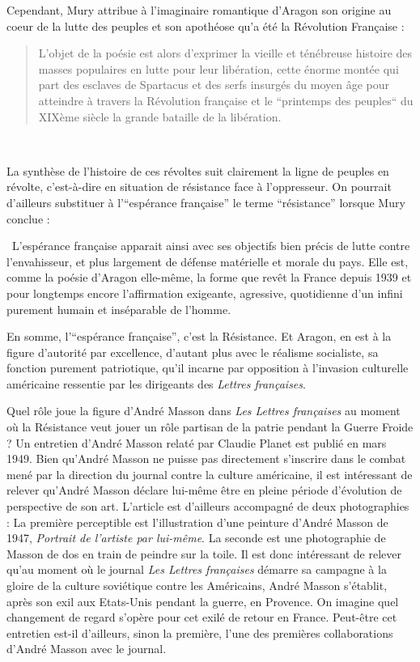 Cependant, Mury attribue à l’imaginaire romantique d’Aragon son origine au coeur de la lutte des peuples et son apothéose qu’a été la Révolution Française : 

\begin{quote}
 L’objet de la poésie est alors d’exprimer la vieille et ténébreuse histoire des masses populaires en lutte pour leur libération, cette énorme montée qui part des esclaves de Spartacus et des serfs insurgés du moyen âge pour atteindre à travers la Révolution française et le “printemps des peuples“ du XIXème siècle la grande bataille de la libération.   
\end{quote} 

 La synthèse de l’histoire de ces révoltes suit clairement la ligne de peuples en révolte, c’est-à-dire en situation de résistance face à l’oppresseur. On pourrait d’ailleurs substituer à l’\enquote{espérance française} le terme \enquote{résistance} lorsque Mury conclue : 

 L’espérance française apparait ainsi avec ses objectifs bien précis de lutte contre l’envahisseur, et plus largement de défense matérielle et morale du pays. Elle est, comme la poésie d’Aragon elle-même, la forme que revêt la France depuis 1939 et pour longtemps encore l’affirmation exigeante, agressive, quotidienne d’un infini purement humain et inséparable de l’homme.

	 En somme, l’\enquote{espérance française}, c’est la Résistance. Et Aragon, en est à la figure d’autorité par excellence, d’autant plus avec le réalisme socialiste, sa fonction purement patriotique, qu’il incarne par opposition à l’invasion culturelle américaine ressentie par les dirigeants des \emph{Lettres françaises}. 

     Quel rôle joue la figure d’André Masson dans \emph{Les Lettres françaises} au moment où la Résistance veut jouer un rôle partisan de la patrie pendant la Guerre Froide ? Un entretien d’André Masson relaté par Claudie Planet est publié en mars 1949. Bien qu’André Masson ne puisse pas directement s’inscrire dans le combat mené par la direction du journal contre la culture américaine, il est intéressant de relever qu’André Masson déclare lui-même être en pleine période d’évolution de perspective de son art. L’article est d’ailleurs accompagné de deux photographies : La première perceptible est l’illustration d’une peinture d’André Masson de 1947, \emph{Portrait de l’artiste par lui-même}. La seconde est une photographie de Masson de dos en train de peindre sur la toile. Il est donc intéressant de relever qu’au moment où le journal \emph{Les Lettres françaises} démarre sa campagne à la gloire de la culture soviétique contre les Américains, André Masson s’établit, après son exil aux Etats-Unis pendant la guerre, en Provence. On imagine quel changement de regard s’opère pour cet exilé de retour en France. Peut-être cet entretien est-il d’ailleurs, sinon la première, l’une des premières collaborations d’André Masson avec le journal.


